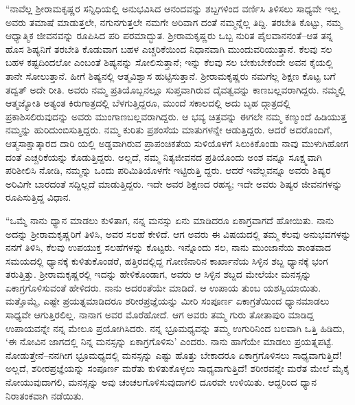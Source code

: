 “ನಾವೆಲ್ಲ ಶ್ರೀರಾಮಕೃಷ್ಣರ ಸನ್ನಿಧಿಯಲ್ಲಿ ಅನುಭವಿಸಿದ ಆನಂದವನ್ನು ಶಬ್ದಗಳಿಂದ ವರ್ಣಿಸಿ ತಿಳಿಸಲು ಸಾಧ್ಯವೇ ಇಲ್ಲ. ಅವರು ತಮಾಷೆ ಮಾಡುತ್ತಲೇ, ನಗುನಗುತ್ತಲೇ ನಮಗೇ ಅರಿವಾಗ ದಂತೆ ನಮ್ಮನ್ನೆಲ್ಲ ತಿದ್ದಿ. ತರಬೇತಿ ಕೊಟ್ಟು, ನಮ್ಮ ಆಧ್ಯಾತ್ಮಿಕ ಜೀವನವನ್ನು ರೂಪಿಸಿದ ಪರಿ ಪರಮಾದ್ಭುತ. ಶ್ರೀರಾಮಕೃಷ್ಣರು ಒಬ್ಬ ನುರಿತ ಪೈಲವಾನನಂತೆ–ಆತ ತನ್ನ ಹೊಸ ಶಿಷ್ಯನಿಗೆ ತರಬೇತಿ ಕೊಡುವಾಗ ಬಹಳ ಎಚ್ಚರಿಕೆಯಿಂದ ನಿಧಾನವಾಗಿ ಮುಂದುವರಿಯುತ್ತಾನೆ. ಕೆಲವು ಸಲ ಬಹಳ ಕಷ್ಟದಿಂದಲೋ ಎಂಬಂತೆ ಶಿಷ್ಯನನ್ನು ಸೋಲಿಸುತ್ತಾನೆ; ಇನ್ನು ಕೆಲವು ಸಲ ಬೇಕುಬೇಕೆಂದೇ ಅವನ ಕೈಯಲ್ಲಿ ತಾನೇ ಸೋಲುತ್ತಾನೆ. ಹೀಗೆ ಶಿಷ್ಯನಲ್ಲಿ ಆತ್ಮವಿಶ್ವಾಸ ಹುಟ್ಟಿಸುತ್ತಾನೆ. ಶ್ರೀರಾಮಕೃಷ್ಣರು ನಮಗೆಲ್ಲ ಶಿಕ್ಷಣ ಕೊಟ್ಟ ಬಗೆ ತದ್ವತ್ ಅದೇ ರೀತಿ. ಅವರು ನಮ್ಮ ಪ್ರತಿಯೊಬ್ಬನಲ್ಲೂ ಸುಪ್ತವಾಗಿರುವ ದೈವತ್ವವನ್ನು ಕಾಣಬಲ್ಲವರಾಗಿದ್ದರು. ನಮ್ಮಲ್ಲಿ ಆತ್ಮಜ್ಯೋತಿ ಅತ್ಯಂತ ಕಿರುಗಾತ್ರದಲ್ಲಿ ಬೆಳಗುತ್ತಿದ್ದರೂ, ಮುಂದೆ ಸಕಾಲದಲ್ಲಿ ಅದು ಬೃಹ ದ್ಗಾತ್ರದಲ್ಲಿ ಪ್ರಕಾಶಿಸಲಿರುವುದನ್ನು ಅವರು ಮುಂಗಾಣಬಲ್ಲವರಾಗಿದ್ದರು. ಆ ಭವ್ಯ ಚಿತ್ರವನ್ನು ಈಗಲೇ ನಮ್ಮ ಕಣ್ಮುಂದೆ ಹಿಡಿಯುತ್ತ ನಮ್ಮನ್ನು ಹುರಿದುಂಬಿಸುತ್ತಿದ್ದರು. ನಮ್ಮ ಕುರಿತು ಪ್ರಶಂಸೆಯ ಮಾತುಗಳನ್ನೇ ಆಡುತ್ತಿದ್ದರು. ಆದರೆ ಅದರೊಂದಿಗೆ, ಆತ್ಮಸಾಕ್ಷಾತ್ಕಾರದ ದಾರಿ ಯಲ್ಲಿ ಅಡ್ಡವಾಗಿರುವ ಪ್ರಾಪಂಚಿಕತೆಯ ಸುಳಿಯೊಳಗೆ ಸಿಲುಕಿಕೊಂಡು ನಾವು ಮುಳುಗಿಹೋಗ ದಂತೆ ಎಚ್ಚರಿಕೆಯನ್ನು ಕೊಡುತ್ತಿದ್ದರು. ಅಲ್ಲದೆ, ನಮ್ಮ ನಿತ್ಯಜೀವನದ ಪ್ರತಿಯೊಂದು ಅಂಶ ವನ್ನೂ ಸೂಕ್ಷ್ಮವಾಗಿ ಪರಿಶೀಲಿಸಿ ನೋಡಿ, ನಮ್ಮನ್ನು ಒಂದು ಪರಿಮಿತಿಯೊಳಗೇ ಇಟ್ಟಿರುತ್ತಿ ದ್ದರು. ಆದರೆ ಇವೆಲ್ಲವನ್ನೂ ಅವರು ಶಿಷ್ಯರ ಅರಿವಿಗೇ ಬಾರದಂತೆ ಸದ್ದಿಲ್ಲದೆ ಮಾಡುತ್ತಿದ್ದರು. ಇದೇ ಅವರ ಶಿಕ್ಷಣದ ರಹಸ್ಯ; ಇದೇ ಅವರು ಶಿಷ್ಯರ ಜೀವನಗಳನ್ನು ರೂಪಿಸುತ್ತಿದ್ದ ವಿಧಾನ.

“ಒಮ್ಮೆ ನಾನು ಧ್ಯಾನ ಮಾಡಲು ಕುಳಿತಾಗ, ನನ್ನ ಮನಸ್ಸು ಏನು ಮಾಡಿದರೂ ಏಕಾಗ್ರವಾಗದೆ ಹೋಯಿತು. ನಾನು ಅದನ್ನು ಶ್ರೀರಾಮಕೃಷ್ಣರಿಗೆ ತಿಳಿಸಿ, ಅವರ ಸಲಹೆ ಕೇಳಿದೆ. ಆಗ ಅವರು ಈ ವಿಷಯದಲ್ಲಿ ತಮ್ಮ ಕೆಲವು ಅನುಭವಗಳನ್ನು ನನಗೆ ತಿಳಿಸಿ, ಕೆಲವು ಉಪಯುಕ್ತ ಸಲಹೆಗಳನ್ನು ಕೊಟ್ಟರು. ಇನ್ನೊಂದು ಸಲ, ನಾನು ಮುಂಜಾನೆಯ ಶಾಂತವಾದ ಸಮಯದಲ್ಲಿ ಧ್ಯಾನಕ್ಕೆ ಕುಳಿತುಕೊಂಡರೆ, ಹತ್ತಿರದಲ್ಲಿದ್ದ ಗೋಣಿನಾರಿನ ಕಾರ್ಖಾನೆಯ ಸಿಳ್ಳಿನ ಶಬ್ದ ಧ್ಯಾನಕ್ಕೆ ಭಂಗ ತರುತ್ತಿತ್ತು. ಶ್ರೀರಾಮಕೃಷ್ಣರಲ್ಲಿ ಇದನ್ನು ಹೇಳಿಕೊಂಡಾಗ, ಅವರು ಆ ಸಿಳ್ಳಿನ ಶಬ್ದದ ಮೇಲೆಯೇ ಮನಸ್ಸನ್ನು ಏಕಾಗ್ರಗೊಳಿಸುವಂತೆ ಹೇಳಿದರು. ನಾನು ಅದರಂತೆಯೇ ಮಾಡಿದೆ. ಆ ಉಪಾಯ ತುಂಬ ಯಶಸ್ವಿಯಾಯಿತು. ಮತ್ತೊಮ್ಮೆ, ಎಷ್ಟೇ ಪ್ರಯತ್ನಮಾಡಿದರೂ ಶರೀರಪ್ರಜ್ಞೆಯನ್ನು ಮೀರಿ ಸಂಪೂರ್ಣ ಏಕಾಗ್ರತೆಯಿಂದ ಧ್ಯಾನಮಾಡಲು ಸಾಧ್ಯವೇ ಆಗುತ್ತಿರಲಿಲ್ಲ. ನಾನಾಗ ಅವರ ಮೊರೆಹೋದೆ. ಆಗ ಅವರು ತಮ್ಮ ಗುರು ತೋತಾಪುರಿ ಮಾಡಿದ್ದ ಉಪಾಯವನ್ನೇ ನನ್ನ ಮೇಲೂ ಪ್ರಯೋಗಿಸಿದರು. ನನ್ನ ಭ್ರೂಮಧ್ಯವನ್ನು ತಮ್ಮ ಉಗುರಿನಿಂದ ಬಲವಾಗಿ ಒತ್ತಿ ಹಿಡಿದು, ‘ಈ ನೋವಿನ ಜಾಗದಲ್ಲಿ ನಿನ್ನ ಮನಸ್ಸನ್ನು ಏಕಾಗ್ರಗೊಳಿಸು’ ಎಂದರು. ನಾನು ಹಾಗೆಯೇ ಮಾಡಲು ಪ್ರಯತ್ನಪಟ್ಟೆ. ನೋಡುತ್ತೇನೆ–ನನಗೀಗ ಭ್ರೂಮಧ್ಯದಲ್ಲಿ ಮನಸ್ಸನ್ನು ಎಷ್ಟು ಹೊತ್ತು ಬೇಕಾದರೂ ಏಕಾಗ್ರಗೊಳಿಸಲು ಸಾಧ್ಯವಾಗುತ್ತಿದೆ! ಅಲ್ಲದೆ, ಶರೀರಪ್ರಜ್ಞೆಯನ್ನು ಸಂಪೂರ್ಣ ಮರೆತು ಕುಳಿತುಕೊಳ್ಳಲು ಸಾಧ್ಯವಾಗುತ್ತಿದೆ! ಶರೀರವನ್ನೇ ಮರೆತ ಮೇಲೆ ಮೈಕೈ ನೋಯುವುದಾಗಲಿ, ಮನಸ್ಸನ್ನು ಅವು ಚಂಚಲಗೊಳಿಸುವುದಾಗಲಿ ದೂರವೇ ಉಳಿಯಿತು. ಆದ್ದರಿಂದ ಧ್ಯಾನ ನಿರಾತಂಕವಾಗಿ ನಡೆಯಿತು.

